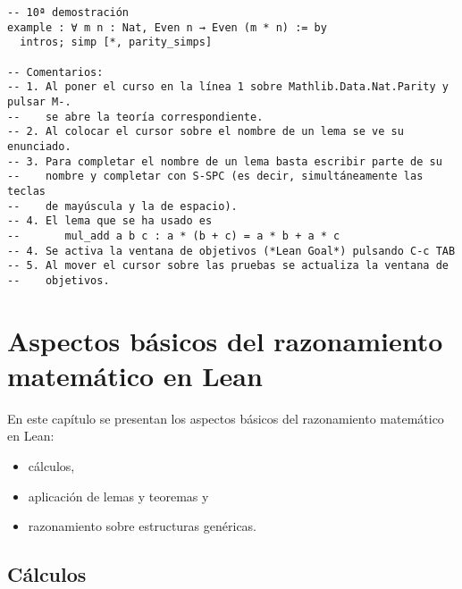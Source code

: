 \begin{verbatim}
-- 10ª demostración
example : ∀ m n : Nat, Even n → Even (m * n) := by
  intros; simp [*, parity_simps]

-- Comentarios:
-- 1. Al poner el curso en la línea 1 sobre Mathlib.Data.Nat.Parity y pulsar M-.
--    se abre la teoría correspondiente.
-- 2. Al colocar el cursor sobre el nombre de un lema se ve su enunciado.
-- 3. Para completar el nombre de un lema basta escribir parte de su
--    nombre y completar con S-SPC (es decir, simultáneamente las teclas
--    de mayúscula y la de espacio).
-- 4. El lema que se ha usado es
--       mul_add a b c : a * (b + c) = a * b + a * c
-- 4. Se activa la ventana de objetivos (*Lean Goal*) pulsando C-c TAB
-- 5. Al mover el cursor sobre las pruebas se actualiza la ventana de
--    objetivos.
\end{verbatim}

\chapter{Aspectos básicos del razonamiento matemático en Lean}
\label{sec:org808e203}

En este capítulo se presentan los aspectos básicos del razonamiento matemático
en Lean:
\begin{itemize}
\item cálculos,
\item aplicación de lemas y teoremas y
\item razonamiento sobre estructuras genéricas.
\end{itemize}

\section{Cálculos}
\label{sec:org02f352b}

